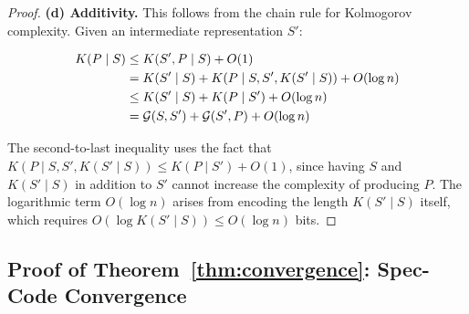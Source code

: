 \documentclass[11pt, a4paper, logo, copyright]{googledeepmind}
\begin{document}
\begin{proof}
\textbf{(d) Additivity.} This follows from the chain rule for Kolmogorov complexity. Given an intermediate representation $S'$:

\begin{align}
K(P \mid S) &\leq K(S', P \mid S) + O(1) \notag \\
&= K(S' \mid S) + K(P \mid S, S', K(S' \mid S)) + O(\log n) \notag \\
&\leq K(S' \mid S) + K(P \mid S') + O(\log n) \notag \\
&= \mathcal{G}(S, S') + \mathcal{G}(S', P) + O(\log n)
\end{align}

The second-to-last inequality uses the fact that $K(P \mid S, S', K(S' \mid S)) \leq K(P \mid S') + O(1)$, since having $S$ and $K(S' \mid S)$ in addition to $S'$ cannot increase the complexity of producing $P$. The logarithmic term $O(\log n)$ arises from encoding the length $K(S' \mid S)$ itself, which requires $O(\log K(S' \mid S)) \leq O(\log n)$ bits.
\end{proof}


\subsection{Proof of Theorem~\ref{thm:convergence}: Spec-Code Convergence}
\end{document}
